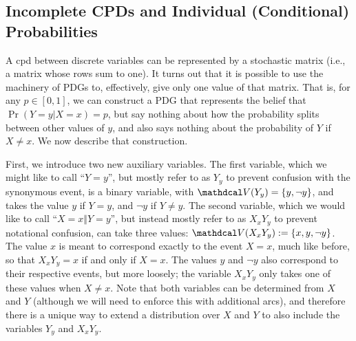 \subsection{Incomplete CPDs and Individual (Conditional) Probabilities}
    \label{sec:prob-widget}
    
A cpd between discrete variables can be represented by
    a stochastic matrix (i.e., a matrix whose rows sum to one).
It turns out that it is possible to use the machinery of PDGs
    to, effectively, give only one value of that matrix.
That is, for any $p \in [0,1]$, we can construct a PDG
    that represents the belief that $\Pr(Y{=}y|X={x}) = p$, but say nothing about
    how the probability splits between other values of $y$, and also says nothing
    about the probability of $Y$ if $X \ne x$.
We now describe that construction.

\def\XxYy{{X{=}x\Vert Y{=}y}}
\def\XxYyshort{{X_x Y_y}}
\def\Yy{{Y{=}y}}
\def\Yyshort{{Y_y}}

First, we introduce two new auxiliary variables.
The first variable, which we might like to call ``$\Yy$'', but
    mostly refer to as $\Yyshort$ to prevent confusion with the synonymous
    event, is a binary variable, with $\V(\Yyshort) = \{y, \lnot y\}$,
    and takes the value $y$ if $Y=y$, and $\lnot y$ if $Y \ne y$.
The second variable, which we would like to call ``$\XxYy$'',
    but instead mostly refer to as $\XxYyshort$ to prevent notational confusion,
    can take three values: $\V(\XxYyshort):= \{ x, y, \lnot y \}$.
The value $x$ is meant to correspond exactly to the event $X{=}x$,
    much like before, so that $\XxYyshort = x$ if and only if $X = x$.
The values $y$ and $\lnot y$ also correspond to their respective
    events, but more loosely; the variable $\XxYyshort$ only takes one of these
    values when $X \ne x$.
Note that both variables can be determined from $X$ and $Y$
(although we will need to enforce this with additional arcs), and
therefore there is a unique way to extend a
distribution over $X$ and $Y$ to also include the variables $\Yyshort$ and $\XxYyshort$.

